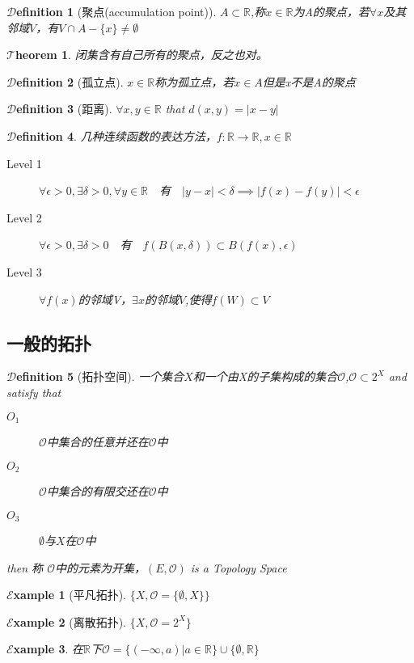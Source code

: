 \documentclass[hyperfer,UTF8,a4paper,12pt]{article}
\theoremstyle{plain}
\newtheorem{Thm}{$\mathcal{T}$heorem}
\newtheorem{Def}{{$\mathcal{D}$efinition}}[section]
\newtheorem*{Example}{$\mathcal{E}$xample}
\begin{document}
\begin{Def}[聚点(accumulation point)]
	$ A\subset\mathbb{R} $,称$ x\in\mathbb{R} $为A的聚点，若$ \forall x$及其邻域$ V $，有$ V\cap A-\{x\}\not=\emptyset $
\end{Def}

\begin{Thm}
	闭集含有自己所有的聚点，反之也对。
\end{Thm}
\begin{Def}[孤立点]
	$ x\in\mathbb{R} $称为孤立点，若$ x\in A $但是x不是A的聚点
\end{Def}
\begin{Def}[距离]
	$ \forall x,y\in \mathbb{R} $ that $ d(x,y)=|x-y|$
\end{Def}
\begin{Def}
	几种连续函数的表达方法，$ f:\mathbb{R}\to\mathbb{R},x\in\mathbb{R} $
	
	\begin{description}
		\item[Level 1] $ \forall \epsilon>0,\exists\delta>0,\forall y\in
	\mathbb{R}\quad $有$\quad |y-x|<\delta\implies|f(x)-f(y)|<\epsilon $
		\item[Level 2]$ \forall \epsilon>0,\exists \delta>0\quad $有$\quad f(B(x,\delta))\subset B(f(x),\epsilon)  $
		\item[Level 3]$ \forall f(x) $的邻域V，$ \exists x $的邻域$ V $,使得$ f(W)\subset V $
	\end{description}
\end{Def}



\subsection{一般的拓扑}
\begin{Def}[拓扑空间]
	一个集合$ X $和一个由X的子集构成的集合$ \mathcal{O} $,$ \mathcal{O}\subset 2^X $ and satisfy that
	\begin{description}
		\item[$ O_1 $] $ \mathcal{O} $中集合的任意并还在$ \mathcal{O} $中 
		\item[$ O_2 $] $ \mathcal{O} $中集合的有限交还在$ \mathcal{O} $中
		\item[$ O_3 $] $ \emptyset $与$ X $在$ \mathcal{O} $中
	\end{description}
	then 称 $ \mathcal{O} $中的元素为开集，$ (E,\mathcal{O} ) $ is a Topology Space
\end{Def}

\begin{Example}[平凡拓扑]
	$ \{X,\mathcal{O}=\{\emptyset,X \}  \} $
\end{Example}
\begin{Example}[离散拓扑]
	$ \{X,\mathcal{O}=2^X \} $
\end{Example}
\begin{Example}
	在$ \mathbb{R} $下$ \mathcal{O}=\{(-\infty,a)|a\in\mathbb{R}\}\cup\{\emptyset,\mathbb{R}\} $
\end{Example}
\end{document}
